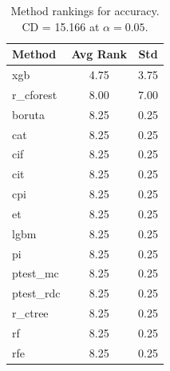 \begin{table}[h]
\centering
\caption{Method rankings for accuracy. CD = 15.166 at $\alpha=0.05$.}
\label{tab:ranks_accuracy}
\begin{tabular}{lcc}
\toprule
Method & Avg Rank & Std \\
\midrule
xgb & 4.75 & 3.75 \\
r_cforest & 8.00 & 7.00 \\
boruta & 8.25 & 0.25 \\
cat & 8.25 & 0.25 \\
cif & 8.25 & 0.25 \\
cit & 8.25 & 0.25 \\
cpi & 8.25 & 0.25 \\
et & 8.25 & 0.25 \\
lgbm & 8.25 & 0.25 \\
pi & 8.25 & 0.25 \\
ptest_mc & 8.25 & 0.25 \\
ptest_rdc & 8.25 & 0.25 \\
r_ctree & 8.25 & 0.25 \\
rf & 8.25 & 0.25 \\
rfe & 8.25 & 0.25 \\
\bottomrule
\end{tabular}
\end{table}